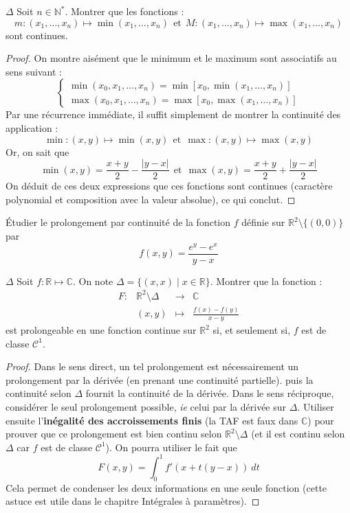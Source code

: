 \documentclass[french,a4paper]{article}
\newcommand{\N}{\mathbb{N}}
\newcommand{\R}{\mathbb{R}}
\newcommand{\C}{\mathbb{C}}
\newcommand{\st}{^*}
\theoremstyle{plain}
\theoremstyle{definition}
\theoremstyle{remark}
\begin{document}
\begin{ex}[Moulin.14]{$\Delta$}
	Soit $n\in\N\st$. Montrer que les fonctions : $$m:(x_1,\ldots,x_n)\mapsto\min(x_1,\ldots,x_n)\ \ \text{et}\ \ M:(x_1,\ldots,x_n)\mapsto\max(x_1,\ldots,x_n)$$ sont continues.
\end{ex}
\begin{proof}
	On montre aisément que le minimum et le maximum sont associatifs au sens suivant : $$\begin{cases}
		\min(x_0,x_1,\ldots,x_n)=\min\left[x_0,\min(x_1,\ldots,x_n)\right] \\
		\max(x_0,x_1,\ldots,x_n)=\max\left[x_0,\max(x_1,\ldots,x_n)\right]
	\end{cases}$$ Par une récurrence immédiate, il suffit simplement de montrer la continuité des application : $$\min:(x,y)\mapsto\min(x,y) \ \ \text{et} \ \ \max:(x,y)\mapsto\max(x,y)$$ Or, on sait que $$\min(x,y)=\frac{x+y}{2}-\frac{\lvert y-x\rvert}{2} \ \ \text{et} \ \ \max(x,y)=\frac{x+y}{2}+\frac{\lvert y-x\rvert}{2}$$ On déduit de ces deux expressions que ces fonctions sont continues (caractère polynomial et composition avec la valeur absolue), ce qui conclut.
\end{proof}

\begin{ex}[Moulin.15]{}
	Étudier le prolongement par continuité de la fonction $f$ définie sur $\R^2\setminus\{(0,0)\}$ par $$f(x,y)=\frac{e^y-e^x}{y-x}$$
\end{ex}

\begin{ex}[Moulin.16]{$\Delta$}
	Soit $f:\R\mapsto\C$. On note $\Delta=\{(x,x)\mid x\in\R\}$. Montrer que la fonction : $$\begin{array}{lrcl}
		F:&\R^2\setminus\Delta&\longrightarrow&\C\\
		&(x,y)&\longmapsto&\displaystyle\frac{f(x)-f(y)}{x-y}
	\end{array}$$ est prolongeable en une fonction continue sur $\R^2$ si, et seulement si, $f$ est de classe $\mathcal{C}^1$.
\end{ex}
\begin{proof}
	Dans le sens direct, un tel prolongement est nécessairement un prolongement par la dérivée (en prenant une continuité partielle). puis la continuité selon $\Delta$ fournit la continuité de la dérivée. Dans le sens réciproque, considérer le seul prolongement possible, \textit{ie} celui par la dérivée sur $\Delta$. Utiliser ensuite l'\textbf{inégalité des accroissements finis} (la TAF est faux dans $\C$) pour prouver que ce prolongement est bien continu selon $\R^2\setminus\Delta$ (et il est continu selon $\Delta$ car $f$ est de classe $\mathcal{C}^1$). On pourra utiliser le fait que $$F(x,y)=\int_{0}^{1}f'(x+t(y-x))\ dt$$ Cela permet de condenser les deux informations en une seule fonction (cette astuce est utile dans le chapitre Intégrales à paramètres).
\end{proof}
\end{document}
